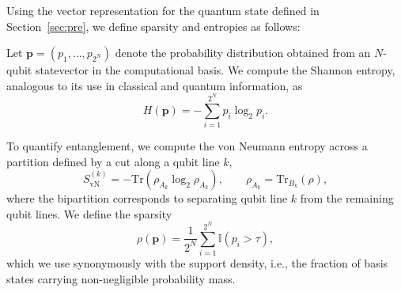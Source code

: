 Using the vector representation for the quantum state defined in
Section~\ref{sec:pre}, we define sparsity and entropies as follows:

Let $\mathbf{p} = (p_1,\dots,p_{2^N})$ denote the probability distribution obtained from an $N$-qubit statevector in the computational basis. We compute the Shannon entropy, analogous to its use in classical and quantum information, as
\begin{equation}
H(\mathbf{p}) = - \sum_{i=1}^{2^N} p_i \log_2 p_i.
\end{equation}

To quantify entanglement, we compute the von Neumann entropy across a partition defined by a cut along a qubit line $k$,
\begin{equation}
S_{\mathrm{vN}}^{(k)} = -\mathrm{Tr}\!\left(\rho_{A_k}\log_2\rho_{A_k}\right),
\qquad
\rho_{A_k} = \mathrm{Tr}_{B_k}(\rho),
\end{equation}
where the bipartition corresponds to separating qubit line $k$ from the remaining qubit lines. We define the sparsity
\begin{equation}
\rho(\mathbf{p}) = \frac{1}{2^N} \sum_{i=1}^{2^N} \mathbb{I}(p_i > \tau),
\end{equation}
which we use synonymously with the support density, i.e., the fraction of basis states carrying non-negligible probability mass. 

